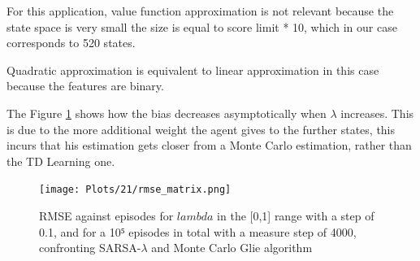 \documentclass[12pt,a4paper]{article}
\begin{document}
For this application, value function approximation is not relevant because the state space is very small the size is equal to score limit * 10, which in our case corresponds to 520 states. 	

Quadratic approximation is equivalent to linear approximation in this case because the features are binary.

The Figure \ref{fig:rmsematrix} shows how the bias decreases asymptotically when $\lambda$ increases. This is due to the more additional weight the agent gives to the further states, this incurs that his estimation gets closer from a Monte Carlo estimation, rather than the TD Learning one.

\begin{figure}[H]
	\centering
	\texttt{[image: Plots/21/rmse\_matrix.png]}
	\caption{RMSE against episodes for $lambda$ in the [0,1] range with a step of 0.1, and for a 10⁵ episodes in total with a measure step of 4000, confronting SARSA-$\lambda$ and Monte Carlo Glie algorithm}
	\label{fig:rmsematrix}
\end{figure}
\end{document}
